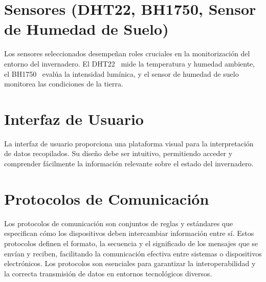 \section{Sensores (DHT22, BH1750, Sensor de Humedad de Suelo)}
Los sensores seleccionados desempeñan roles cruciales en la monitorización del entorno del invernadero. El DHT22~\cite{manual:DHT22} mide la temperatura y humedad ambiente, el BH1750~\cite{manual:BH1750} evalúa la intensidad lumínica, y el sensor de humedad de suelo~\cite{wiki:SensorHumedadSuelo} monitorea las condiciones de la tierra.

\section{Interfaz de Usuario}
La interfaz de usuario proporciona una plataforma visual para la interpretación de datos recopilados. Su diseño debe ser intuitivo, permitiendo acceder y comprender fácilmente la información relevante sobre el estado del invernadero.

\section{Protocolos de Comunicación}
Los protocolos de comunicación son conjuntos de reglas y estándares que especifican cómo los dispositivos deben intercambiar información entre sí. Estos protocolos definen el formato, la secuencia y el significado de los mensajes que se envían y reciben, facilitando la comunicación efectiva entre sistemas o dispositivos electrónicos. Los protocolos son esenciales para garantizar la interoperabilidad y la correcta transmisión de datos en entornos tecnológicos diversos.


